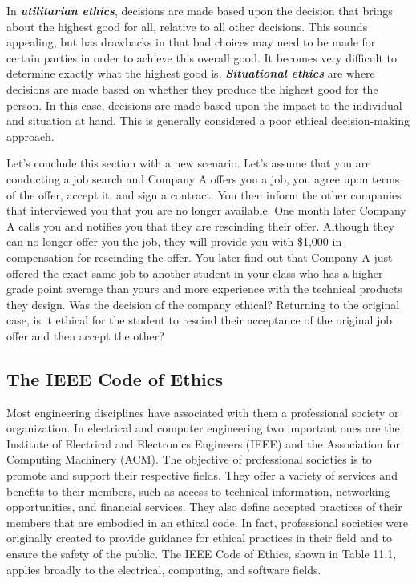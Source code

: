 In \emph{\textbf{utilitarian ethics}}, decisions are made based upon the
decision that brings about the highest good for all, relative to all
other decisions. This sounds appealing, but has drawbacks in that bad
choices may need to be made for certain parties in order to achieve this
overall good. It becomes very difficult to determine exactly what the
highest good is. \emph{\textbf{Situational ethics}} are where decisions
are made based on whether they produce the highest good for the person.
In this case, decisions are made based upon the impact to the individual
and situation at hand. This is generally considered a poor ethical
decision-making approach.

Let's conclude this section with a new scenario. Let's assume that you
are conducting a job search and Company A offers you a job, you agree
upon terms of the offer, accept it, and sign a contract. You then inform
the other companies that interviewed you that you are no longer
available. One month later Company A calls you and notifies you that
they are rescinding their offer. Although they can no longer offer you
the job, they will provide you with \$1,000 in compensation for
rescinding the offer. You later find out that Company A just offered the
exact same job to another student in your class who has a higher grade
point average than yours and more experience with the technical products
they design. Was the decision of the company ethical? Returning to the
original case, is it ethical for the student to rescind their acceptance
of the original job offer and then accept the other?

\subsection{The IEEE Code of Ethics}\label{the-ieee-code-of-ethics}

Most engineering disciplines have associated with them a professional
society or organization. In electrical and computer engineering two
important ones are the Institute of Electrical and Electronics Engineers
(IEEE) and the Association for Computing Machinery (ACM). The objective
of professional societies is to promote and support their respective
fields. They offer a variety of services and benefits to their members,
such as access to technical information, networking opportunities, and
financial services. They also define accepted practices of their members
that are embodied in an ethical code. In fact, professional societies
were originally created to provide guidance for ethical practices in
their field and to ensure the safety of the public. The IEEE Code of
Ethics, shown in Table 11.1, applies broadly to the electrical,
computing, and software fields.

